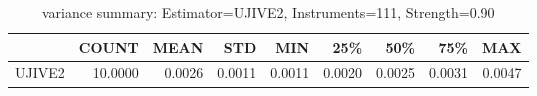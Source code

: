 \begin{table}[ht]
\centering
\caption{variance summary: Estimator=UJIVE2, Instruments=111, Strength=0.90}
\begin{tabular}{lrrrrrrrr}
\toprule
 & COUNT & MEAN & STD & MIN & 25\% & 50\% & 75\% & MAX \\
\midrule
UJIVE2 & 10.0000 & 0.0026 & 0.0011 & 0.0011 & 0.0020 & 0.0025 & 0.0031 & 0.0047 \\
\bottomrule
\end{tabular}
\end{table}

